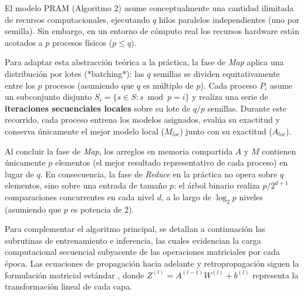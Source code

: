 \documentclass[11pt, a4paper]{article}
\begin{document}
El modelo PRAM (Algoritmo 2) asume conceptualmente una cantidad ilimitada de recursos computacionales, ejecutando $q$ hilos paralelos independientes (uno por semilla). Sin embargo, en un entorno de cómputo real los recursos hardware están acotados a $p$ procesos físicos ($p \le q$). 

Para adaptar esta abstracción teórica a la práctica, la fase de \textit{Map} aplica una distribución por lotes (*batching*): las $q$ semillas se dividen equitativamente entre los $p$ procesos (asumiendo que $q$ es múltiplo de $p$). Cada proceso $P_i$ asume un subconjunto disjunto $S_i = \{ s \in S : s \bmod p = i \}$ y realiza una serie de \textbf{iteraciones secuenciales locales} sobre su lote de $q/p$ semillas. Durante este recorrido, cada proceso entrena los modelos asignados, evalúa su exactitud y conserva únicamente el mejor modelo local ($M_{loc}$) junto con su exactitud ($A_{loc}$).

Al concluir la fase de \textit{Map}, los arreglos en memoria compartida $A$ y $M$ contienen únicamente $p$ elementos (el mejor resultado representativo de cada proceso) en lugar de $q$. En consecuencia, la fase de \textit{Reduce} en la práctica no opera sobre $q$ elementos, sino sobre una entrada de tamaño $p$: el árbol binario realiza $p/2^{d+1}$ comparaciones concurrentes en cada nivel $d$, a lo largo de $\log_2 p$ niveles (asumiendo que $p$ es potencia de 2). 

Para complementar el algoritmo principal, se detallan a continuación las subrutinas de entrenamiento e inferencia, las cuales evidencian la carga computacional secuencial subyacente de las operaciones matriciales por cada época. Las ecuaciones de propagación hacia adelante y retropropagación siguen la formulación matricial estándar \cite{goodfellow2016deep}, donde $Z^{(l)} = A^{(l-1)}W^{(l)} + b^{(l)}$ representa la transformación lineal de cada capa.
\end{document}
